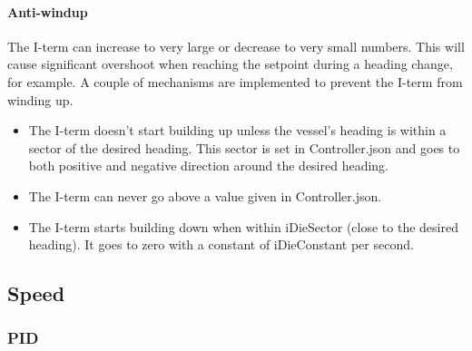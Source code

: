 \documentclass[a4paper]{article}
\begin{document}
\paragraph{Anti-windup}

The I-term can increase to very large or decrease to very small numbers. This will cause significant overshoot when reaching the setpoint during a heading change, for example. 
A couple of mechanisms are implemented to prevent the I-term from winding up.

\begin{itemize}  
\item The I-term doesn't start building up unless the vessel's heading is within a sector of the desired heading. This sector is set in Controller.json and goes to both positive and negative
direction around the desired heading.

\item The I-term can never go above a value given in Controller.json.

\item The I-term starts building down when within iDieSector (close to the desired heading). It goes to zero with a constant of iDieConstant per second.
\end{itemize}

\subsection{Speed}

\subsubsection{PID}
\end{document}
